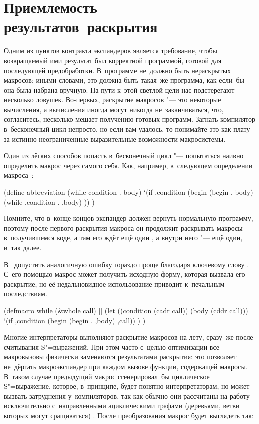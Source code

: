 \section{Приемлемость результатов~раскрытия}\label{macros/sect:accept}

Одним из пунктов контракта экспандеров является требование, чтобы возвращаемый
ими результат был корректной программой, готовой для последующей предобработки.
В~программе не~должно быть нераскрытых макросов; иными словами, это должна быть
такая~же программа, как если~бы она была набрана вручную. На пути к~этой светлой
цели нас подстерегают несколько ловушек. Во-первых, раскрытие макросов "--- это
некоторые вычисления, а вычисления иногда могут никогда не~заканчиваться, что,
согласитесь, несколько мешает получению готовых программ. Загнать компилятор
в~бесконечный цикл непросто, но если вам удалось, то понимайте это как плату
за истинно неограниченные выразительные возможности макросистемы.

Один из лёгких способов попасть в~бесконечный цикл "--- попытаться наивно
определить макрос через самого себя. Как, например, в~следующем определении
макроса~:

\begin{code:lisp}
(define-abbreviation (while condition . body)
  `(if ,condition (begin (begin . body)
                         (while ,condition . ,body) )) )
\end{code:lisp}

Помните, что в~конце концов экспандер должен вернуть нормальную программу,
поэтому после первого раскрытия макроса  он продолжит раскрывать
макросы в~получившемся коде, а там его ждёт ещё один , а внутри него
"--- ещё один, и~так далее.

В~{\CommonLisp} допустить аналогичную ошибку гораздо проще благодаря ключевому
слову . С~его помощью макрос может получить исходную форму, которая
вызвала его раскрытие, но её недальновидное использование приводит к~печальным
последствиям.

\begin{code:lisp}
(defmacro while (&whole call)    |\dialect{\CommonLisp}|
  (let ((condition (cadr call))
        (body      (cddr call)))
    `(if ,condition (begin (begin . ,body) ,call)) ) )
\end{code:lisp}

Многие интерпретаторы выполняют раскрытие макросов на лету, сразу~же после
считывания S"=выражений. При этом часто с~целью оптимизации все макровызовы
физически заменяются результатами раскрытия: это позволяет не~дёргать
макроэкспандер при каждом вызове функции, содержащей макросы. В~таком случае
предыдущий макрос  сгенерировал~бы циклическое S"=выражение, которое,
в~принципе, будет понятно интерпретаторам, но может вызвать затруднения
у~компиляторов, так как обычно они рассчитаны на работу исключительно
с~направленными ациклическими графами (деревьями, ветви которых могут
сращиваться) \cite{que92a}. После преобразования макрос  будет
выглядеть так:

